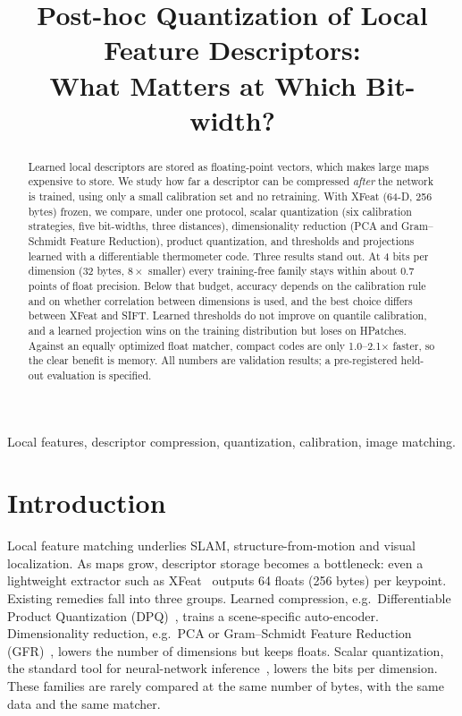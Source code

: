 \documentclass[10pt,conference]{IEEEtran}
\begin{document}
\title{Post-hoc Quantization of Local Feature Descriptors:\\ What Matters at Which Bit-width?}
\author{
}
\maketitle

\begin{abstract}
Learned local descriptors are stored as floating-point vectors, which makes large maps expensive to store. We study how far a descriptor can be compressed \emph{after} the network is trained, using only a small calibration set and no retraining. With XFeat (64-D, 256 bytes) frozen, we compare, under one protocol, scalar quantization (six calibration strategies, five bit-widths, three distances), dimensionality reduction (PCA and Gram--Schmidt Feature Reduction), product quantization, and thresholds and projections learned with a differentiable thermometer code. Three results stand out. At 4 bits per dimension (32 bytes, $8\times$ smaller) every training-free family stays within about 0.7 points of float precision. Below that budget, accuracy depends on the calibration rule and on whether correlation between dimensions is used, and the best choice differs between XFeat and SIFT. Learned thresholds do not improve on quantile calibration, and a learned projection wins on the training distribution but loses on HPatches. Against an equally optimized float matcher, compact codes are only 1.0--2.1$\times$ faster, so the clear benefit is memory. All numbers are validation results; a pre-registered held-out evaluation is specified.
\end{abstract}
\begin{IEEEkeywords}
Local features, descriptor compression, quantization, calibration, image matching.
\end{IEEEkeywords}

\section{Introduction}
Local feature matching underlies SLAM, structure-from-motion and visual localization. As maps grow, descriptor storage becomes a bottleneck: even a lightweight extractor such as XFeat~\cite{xfeat} outputs 64 floats (256 bytes) per keypoint. Existing remedies fall into three groups. Learned compression, e.g.\ Differentiable Product Quantization (DPQ)~\cite{dpq}, trains a scene-specific auto-encoder. Dimensionality reduction, e.g.\ PCA or Gram--Schmidt Feature Reduction (GFR)~\cite{gfr}, lowers the number of dimensions but keeps floats. Scalar quantization, the standard tool for neural-network inference~\cite{nagel,gholami}, lowers the bits per dimension. These families are rarely compared at the same number of bytes, with the same data and the same matcher.
\end{document}
